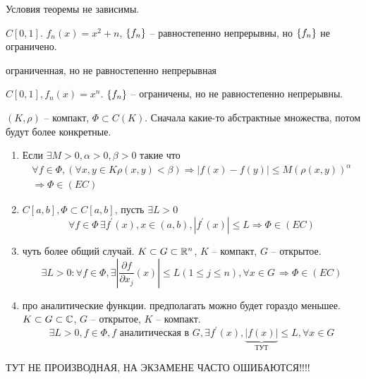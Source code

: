 \documentclass[document]{subfiles}
\begin{document}
\begin{remark}
    Условия теоремы не зависимы.
\end{remark}

\begin{example}
    $C[0,1]$. $f_n(x) = x^2 + n$, $\left\{f_n\right\}$ -- равностепенно непрерывны, но $\left\{f_n\right\}$ не ограничено.
    \begin{figure}
        \centering
    \end{figure}
    
\end{example}

ограниченная, но не равностепенно непрерывная
\begin{example}
    $C[0,1], f_n(x) = x^n$. $\left\{f_n\right\}$ -- ограничены, но не равностепенно непрерывны.
\end{example}


\begin{theoremwobox}
    $(K, \rho)$ -- компакт, $\Phi \subset C(K)$.
    Сначала какие-то абстрактные множества, потом будут более конкретные.
    \begin{enumerate}
        \item Если $\exists M > 0, \alpha > 0, \beta > 0$ такие что 
        \begin{multline*}
            \forall f \in \Phi, (\forall x,y \in K \rho(x,y) < \beta) \Rightarrow |f(x) - f(y)| \leq M(\rho(x,y))^\alpha \\
            \Rightarrow \Phi \in (EC)
        \end{multline*}
        \item $C[a,b], \Phi \subset C[a,b]$, пусть $\exists L > 0$ 
        \[ \forall f \in \Phi \, \exists f^\prime(x), x \in (a,b), |f^\prime(x)| \leq L \Rightarrow \Phi \in (EC) \]
        \item чуть более общий случай. $K \subset G \subset \mathbb{R}^n$, $K$ -- компакт, $G$ -- открытое.
        \[ \exists L > 0 : \forall f \in \Phi, \exists \left| \frac{\partial f}{\partial x_j}  (x) \right| \leq L (1 \leq j \leq n), \forall x \in G \,  \Rightarrow \Phi \in (EC)  \] 
        \item про аналитические функции. предполагать можно будет гораздо меньшее. 
        $K \subset G \subset \mathbb{C}$, $G$ -- открытое, $K$ -- компакт. 
        \[ \exists L > 0, f \in \Phi, f \text{ аналитическая в } G, \exists f^\prime(x), \underbrace{|f(x)|}_{\text{ТУТ}} \leq L, \forall x \in G \] 
    \end{enumerate}
        ТУТ НЕ ПРОИЗВОДНАЯ, НА ЭКЗАМЕНЕ ЧАСТО ОШИБАЮТСЯ!!!!
\end{theoremwobox}
\end{document}
